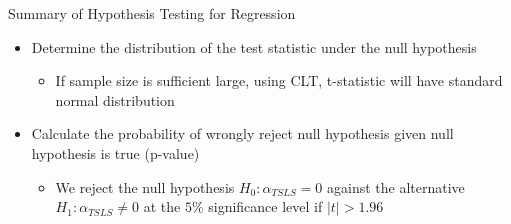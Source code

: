 \documentclass[dvipsnames,hyperref={pdfpagelabels=false}]{beamer}
\begin{document}
\begin{frame}{Summary of Hypothesis Testing for Regression}
	\begin{itemize} 
		
		
		
		\item[5.] Determine the distribution of the test statistic under the null hypothesis
		\begin{itemize} 
			\vspace{0.2cm}
			\item If sample size is sufficient large, using CLT, t-statistic will have standard normal distribution 
		\end{itemize}
		
		\item[6.] Calculate the probability of wrongly reject null hypothesis given null hypothesis is true (p-value)
		\begin{itemize} 
			\vspace{0.2cm}
			\item We reject the null hypothesis $H_0: \alpha_{TSLS}=0$ against the alternative $H_1: \alpha_{TSLS}\neq 0$ at the $5\%$ significance level if $|t|>1.96$
		\end{itemize}
		
		
	\end{itemize}
\end{frame}
\end{document}
